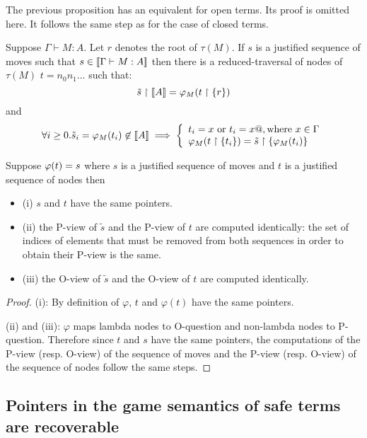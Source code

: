 The previous proposition has an equivalent for open terms. Its proof is omitted here. It
follows the same step as for the case of closed terms.
\begin{prop}
\label{prop:rel_gamesem_redtrav_opened}
Suppose $\Gamma \vdash M : A$. Let $r$ denotes the root of $\tau(M)$. If $s$ is a justified sequence of moves such
that $s \in {[\![\Gamma \vdash M:A ]\!]}$ then there is a reduced-traversal of nodes of $\tau(M)$
$t = n_0 n_1 \ldots$ such that:
 $$\tilde{s} \upharpoonright {[\![A ]\!]} =  \varphi_M (t \upharpoonright \{r \})$$
and
$$\forall i \geq 0 . \tilde{s}_i = \varphi_M(t_i) \not \in {[\![A ]\!]}
\implies \left\{
        \begin{array}{ll}
            t_i = x \mbox{ or } t_i = x@, \hbox{where } x \in \Gamma \\
            \varphi_M(t \upharpoonright \{t_i\}) = \tilde{s} \upharpoonright \{ \varphi_M(t_i) \}
        \end{array}
        \right.
$$
\end{prop}

\begin{property}
\label{proper:phi_pview}
Suppose $\varphi(t) = s$ where $s$ is a justified sequence of moves and
$t$ is a justified sequence of nodes then
\begin{itemize}
\item (i) $s$ and $t$ have the same pointers.
\item (ii) the P-view of $\tilde{s}$ and the P-view of $t$ are computed
identically: the set of indices of elements that must be removed from both sequences
in order to obtain their P-view is the same.
\item (iii) the O-view of $\tilde{s}$ and the O-view of $t$ are computed identically.
\end{itemize}
\end{property}
\begin{proof}
(i): By definition of $\varphi$, $t$ and $\varphi(t)$ have the same pointers.

(ii) and (iii): $\varphi$ maps lambda nodes to
O-question and non-lambda nodes to P-question. Therefore since $t$ and $s$ have the same
pointers, the computations of the P-view (resp. O-view) of the sequence of moves and the P-view
(resp. O-view) of the sequence of nodes follow the same steps.
\end{proof}

\subsection{Pointers in the game semantics of safe terms are recoverable}

